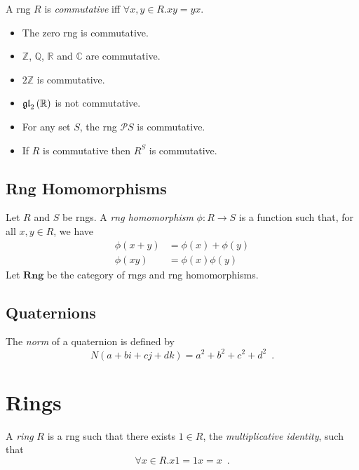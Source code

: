 \begin{df}[Commutative]
A rng $R$ is \emph{commutative} iff $\forall x,y \in R. xy = yx$.
\end{df}

\begin{ex}
\begin{itemize}
\item The zero rng is commutative.
\item $\mathbb{Z}$, $\mathbb{Q}$, $\mathbb{R}$ and $\mathbb{C}$ are commutative.
\item
$2 \mathbb{Z}$ is commutative.
\item $\mathfrak{gl}_{2} \left( {\mathbb{R}} \right)$ is not commutative.
\item For any set $S$, the rng $\mathcal{P} S$ is commutative.
\item If $R$ is commutative then $R^S$ is commutative.
\end{itemize}
\end{ex}

\section{Rng Homomorphisms}

\begin{df}
Let $R$ and $S$ be rngs. A \emph{rng homomorphism} $\phi : R \rightarrow S$ is a function such that, for all $x,y \in R$, we have
\begin{align*}
\phi(x + y) & = \phi(x) + \phi(y) \\
\phi(xy) & = \phi(x) \phi(y)
\end{align*}
Let $\mathbf{Rng}$ be the category of rngs and rng homomorphisms.
\end{df}

\section{Quaternions}

\begin{df}[Norm]
The \emph{norm} of a quaternion is defined by
\[ N(a + bi + cj + dk) = a^2 + b^2 + c^2 + d^2 \enspace . \]
\end{df}

\chapter{Rings}

\begin{df}[Ring]
A \emph{ring} $R$ is a rng such that there exists $1 \in R$, the \emph{multiplicative identity}, such that
\[ \forall x \in R. x1 = 1x = x \enspace . \]
\end{df}

